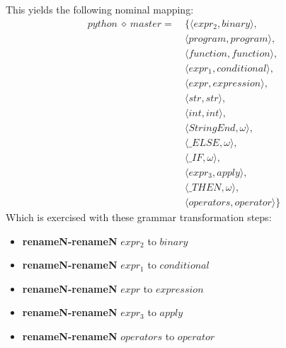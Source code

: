 This yields the following nominal mapping:
\begin{align*}\mathit{python} \:\diamond\: \mathit{master} =\:& \{\langle \mathit{expr_2},\mathit{binary}\rangle,\\
 & \langle \mathit{program},\mathit{program}\rangle,\\
 & \langle \mathit{function},\mathit{function}\rangle,\\
 & \langle \mathit{expr_1},\mathit{conditional}\rangle,\\
 & \langle \mathit{expr},\mathit{expression}\rangle,\\
 & \langle str,str\rangle,\\
 & \langle int,int\rangle,\\
 & \langle \mathit{StringEnd},\omega\rangle,\\
 & \langle \mathit{\_ ELSE},\omega\rangle,\\
 & \langle \mathit{\_ IF},\omega\rangle,\\
 & \langle \mathit{expr_3},\mathit{apply}\rangle,\\
 & \langle \mathit{\_ THEN},\omega\rangle,\\
 & \langle \mathit{operators},\mathit{operator}\rangle\}\end{align*}
 Which is exercised with these grammar transformation steps:

{\footnotesize\begin{itemize}
\item \textbf{renameN-renameN} $\mathit{expr_2}$ to $\mathit{binary}$
\item \textbf{renameN-renameN} $\mathit{expr_1}$ to $\mathit{conditional}$
\item \textbf{renameN-renameN} $\mathit{expr}$ to $\mathit{expression}$
\item \textbf{renameN-renameN} $\mathit{expr_3}$ to $\mathit{apply}$
\item \textbf{renameN-renameN} $\mathit{operators}$ to $\mathit{operator}$
\end{itemize}}

